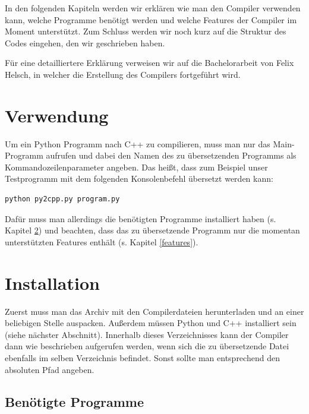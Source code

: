 

In den folgenden Kapiteln werden wir erklären wie man den Compiler verwenden kann, welche Programme benötigt werden und welche Features der Compiler im Moment unterstützt. Zum Schluss werden wir noch kurz auf die Struktur des Codes eingehen, den wir geschrieben haben.

Für eine detailliertere Erklärung verweisen wir auf die Bachelorarbeit von Felix Helsch, in welcher die Erstellung des Compilers fortgeführt wird.



\section{Verwendung}

Um ein Python Programm nach C++ zu compilieren, muss man nur das Main-Programm  aufrufen und dabei den Namen des zu übersetzenden Programms als Kommandozeilenparameter angeben. Das heißt, dass zum Beispiel unser Testprogramm  mit dem folgenden Konsolenbefehl übersetzt werden kann:
\begin{lstlisting}
python py2cpp.py program.py
\end{lstlisting}
Dafür muss man allerdings die benötigten Programme installiert haben (s. Kapitel \ref{progs}) und beachten, dass das zu übersetzende Programm nur die momentan unterstützten Features enthält (s. Kapitel \ref{features}).
\enlargethispage{1cm}

\section{Installation} \label{progs}

Zuerst muss man das Archiv mit den Compilerdateien herunterladen \cite{py2cpp} und an einer beliebigen Stelle auspacken.
Außerdem müssen Python und C++ installiert sein (siehe nächster Abschnitt).
Innerhalb dieses Verzeichnisses kann der Compiler dann wie beschrieben aufgerufen werden, wenn sich die zu übersetzende Datei ebenfalls im selben Verzeichnis befindet.
Sonst sollte man entsprechend den absoluten Pfad angeben.


\subsection{Benötigte Programme}

